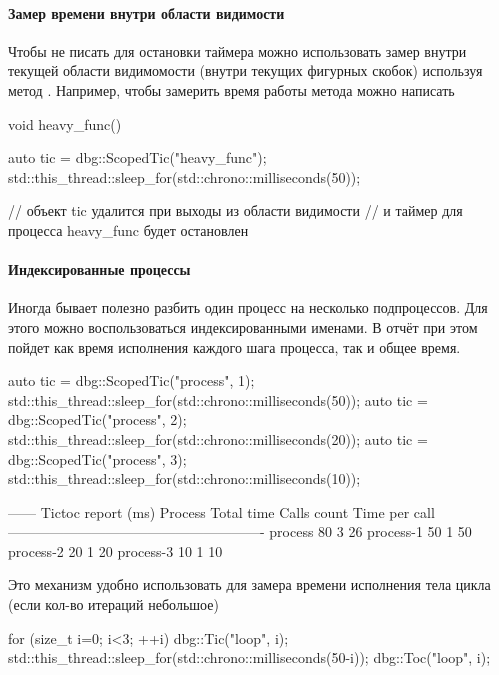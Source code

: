 \paragraph{Замер времени внутри области видимости}
Чтобы не писать  для остановки таймера
можно использовать замер внутри текущей области видимомости (внутри текущих фигурных скобок) используя
метод .
Например, чтобы замерить время работы метода можно написать
\begin{cppcode}
void heavy_func(){
    auto tic = dbg::ScopedTic("heavy_func");
    std::this_thread::sleep_for(std::chrono::milliseconds(50));

    // объект tic удалится при выходы из области видимости
    // и таймер для процесса heavy_func будет остановлен
}
\end{cppcode}

\paragraph{Индексированные процессы}
Иногда бывает полезно разбить один процесс
на несколько подпроцессов. Для этого можно воспользоваться индексированными
именами. В отчёт при этом
пойдет как время исполнения каждого шага процесса, так и общее время.
\begin{cppcode}
{
    auto tic = dbg::ScopedTic("process", 1);
    std::this_thread::sleep_for(std::chrono::milliseconds(50));
}
{
    auto tic = dbg::ScopedTic("process", 2);
    std::this_thread::sleep_for(std::chrono::milliseconds(20));
}
{
    auto tic = dbg::ScopedTic("process", 3);
    std::this_thread::sleep_for(std::chrono::milliseconds(10));
}
\end{cppcode}
\begin{shelloutput}
------ Tictoc report (ms)
Process        Total time    Calls count  Time per call
-------------------------------------------------------
process                80              3             26
process-1              50              1             50
process-2              20              1             20
process-3              10              1             10
\end{shelloutput}

Это механизм удобно использовать для замера
времени исполнения тела цикла (если кол-во итераций небольшое)
\begin{cppcode}
for (size_t i=0; i<3; ++i){
    dbg::Tic("loop", i);
    std::this_thread::sleep_for(std::chrono::milliseconds(50-i));
    dbg::Toc("loop", i);
}
\end{cppcode}

